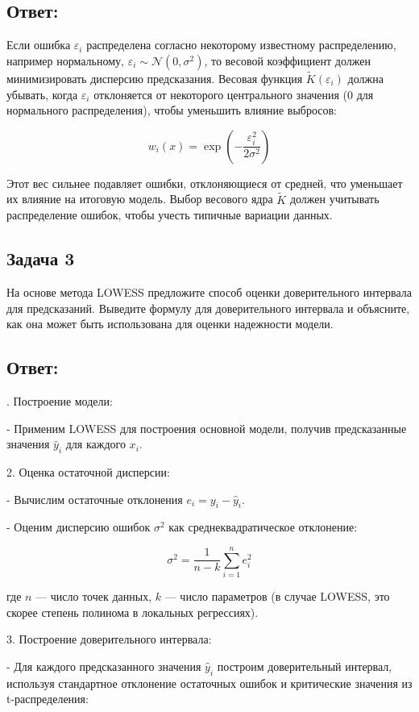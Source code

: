 \subsection{Ответ:}
Если ошибка \(\varepsilon_i\) распределена согласно некоторому известному распределению, например нормальному, \( \varepsilon_i \sim \mathcal{N}(0, \sigma^2)\), то весовой коэффициент должен минимизировать дисперсию предсказания. Весовая функция \(\tilde{K}(\varepsilon_i)\) должна убывать, когда \(\varepsilon_i\) отклоняется от некоторого центрального значения (0 для нормального распределения), чтобы уменьшить влияние выбросов:

\[
w_i(x) = \exp\left(-\frac{\varepsilon_i^2}{2\sigma^2}\right)
\]

Этот вес сильнее подавляет ошибки, отклоняющиеся от средней, что уменьшает их влияние на итоговую модель. Выбор весового ядра \(\tilde{K}\) должен учитывать распределение ошибок, чтобы учесть типичные вариации данных.

\subsection{Задача 3}
На основе метода LOWESS предложите способ оценки доверительного интервала для предсказаний. Выведите формулу для доверительного интервала и объясните, как она может быть использована для оценки надежности модели.

\subsection{Ответ:}

. Построение модели:

   - Применим LOWESS для построения основной модели, получив предсказанные значения \( \hat{y}_i \) для каждого \(x_i\).

2. Оценка остаточной дисперсии:

   - Вычислим остаточные отклонения \(e_i = y_i - \hat{y}_i\).

   - Оценим дисперсию ошибок \(\sigma^2\) как среднеквадратическое отклонение:

     \[
     \sigma^2 = \frac{1}{n-k} \sum_{i=1}^{n} e_i^2
     \]

   где \(n\) — число точек данных, \(k\) — число параметров (в случае LOWESS, это скорее степень полинома в локальных регрессиях).

3. Построение доверительного интервала:

   - Для каждого предсказанного значения \( \hat{y}_i \) построим доверительный интервал, используя стандартное отклонение остаточных ошибок и критические значения из t-распределения:

